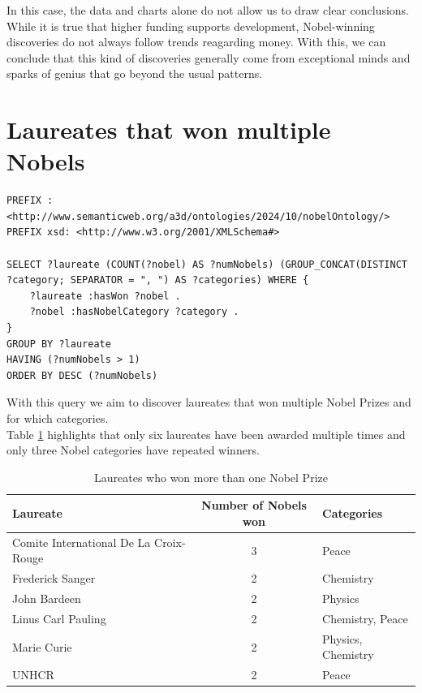 \documentclass{article}
\begin{document}
In this case, the data and charts alone do not allow us to draw clear conclusions. While it is true that higher
funding supports development, Nobel-winning discoveries do not always follow trends reagarding money. With this,
we can conclude that this kind of discoveries generally come from exceptional minds and sparks of genius that
go beyond the usual patterns.

\newpage

\section{Laureates that won multiple Nobels}

\begin{lstlisting}
PREFIX : <http://www.semanticweb.org/a3d/ontologies/2024/10/nobelOntology/>
PREFIX xsd: <http://www.w3.org/2001/XMLSchema#>

SELECT ?laureate (COUNT(?nobel) AS ?numNobels) (GROUP_CONCAT(DISTINCT ?category; SEPARATOR = ", ") AS ?categories) WHERE {
    ?laureate :hasWon ?nobel .
    ?nobel :hasNobelCategory ?category .
}
GROUP BY ?laureate
HAVING (?numNobels > 1)
ORDER BY DESC (?numNobels)
\end{lstlisting}

\vspace{1em}

With this query we aim to discover laureates that won multiple Nobel Prizes and for which categories.\\
Table \ref{tab:moreThanOneNobel} highlights that only six laureates have been awarded multiple times and only three
Nobel categories have repeated winners.

\begin{table}[H]
	\centering
	\caption{Laureates who won more than one Nobel Prize}
	\begin{tabular}{|l|c|l|}
		\hline
		\textbf{Laureate}                      & \textbf{Number of Nobels won} & \textbf{Categories} \\ \hline
		Comite International De La Croix-Rouge & 3                             & Peace               \\ \hline
		Frederick Sanger                       & 2                             & Chemistry           \\ \hline
		John Bardeen                           & 2                             & Physics             \\ \hline
		Linus Carl Pauling                     & 2                             & Chemistry, Peace    \\ \hline
		Marie Curie                            & 2                             & Physics, Chemistry  \\ \hline
		UNHCR                                  & 2                             & Peace               \\ \hline
	\end{tabular}
	\label{tab:moreThanOneNobel}
\end{table}
\end{document}
